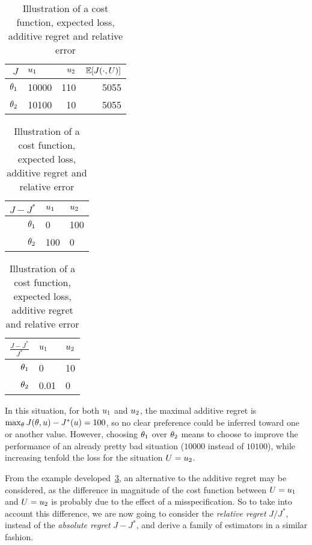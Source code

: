 \documentclass[../../Main_ManuscritThese.tex]{subfiles}
\begin{document}
\begin{table}[ht]
  \centering
  \begin{tabular}{rlrr}
    \toprule
    $J$     & $u_1$ & $u_2$ & $\mathbb{E}[J(\cdot, U)]$  \\ \midrule
    $\theta_1$ & 10000 & 110 & 5055 \\
    $\theta_2$ & 10100 & 10 & 5055 \\ \bottomrule
  \end{tabular}
  \quad
  \begin{tabular}{rll}
    \toprule
    $J-J^*$     & $u_1$ & $u_2$  \\ \midrule
    $\theta_1$ & 0 & 100 \\
    $\theta_2$ & 100 & 0  \\ \bottomrule
  \end{tabular}
    \quad
  \begin{tabular}{rll}
    \toprule
    $\frac{J-J^*}{J^*}$     & $u_1$ & $u_2$  \\ \midrule
    $\theta_1$ & 0 & 10 \\
    $\theta_2$ & 0.01 & 0  \\ \bottomrule
  \end{tabular}  
  \caption{\label{tab:hyp_situation} Illustration of a cost function, expected loss, additive regret and relative error}
\end{table}
In this situation, for both $u_1$ and $u_2$, the maximal additive regret is $\max_{\theta} J(\theta, u) - J^*(u) = 100$, so no clear preference could be inferred toward one or another value. %
However, choosing $\theta_1$ over $\theta_2$ means to choose to improve the performance of an already pretty bad situation ($10000$ instead of $10100$), while increasing tenfold the loss for the situation $U=u_2$. 


From the example developed~\cref{tab:hyp_situation}, an alternative to the additive regret may be considered, as the difference in magnitude of the cost function between $U = u_1$ and $U = u_2$ is probably due to the effect of a misspecification. So to take into account this difference, we are now going to consider the \emph{relative regret} $J/J^*$, instead of the \emph{absolute regret} $J - J^*$, and derive a family of estimators in a similar fashion. 
\end{document}
